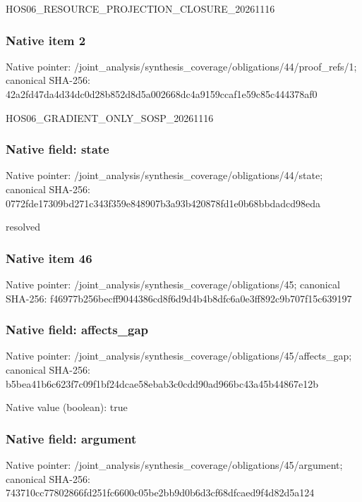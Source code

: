 \documentclass[10pt,a4paper]{article}
\begin{document}
\begingroup\raggedright\sloppy HOS06\_\allowbreak{}RESOURCE\_\allowbreak{}PROJECTION\_\allowbreak{}CLOSURE\_\allowbreak{}20261116\par\endgroup

\subsubsection{Native item 2}
Native pointer: /joint\_\allowbreak{}analysis/synthesis\_\allowbreak{}coverage/obligations/44/proof\_\allowbreak{}refs/1; canonical SHA-256: 42a2fd47da4d34dc0d28b852d8d5a002668dc4a9159ccaf1e59c85c444378af0

\begingroup\raggedright\sloppy HOS06\_\allowbreak{}GRADIENT\_\allowbreak{}ONLY\_\allowbreak{}SOSP\_\allowbreak{}20261116\par\endgroup

\subsubsection{Native field: state}
Native pointer: /joint\_\allowbreak{}analysis/synthesis\_\allowbreak{}coverage/obligations/44/state; canonical SHA-256: 0772fde17309bd271c343f359e848907b3a93b420878fd1e0b68bbdadcd98eda

\begingroup\raggedright\sloppy resolved\par\endgroup

\subsubsection{Native item 46}
Native pointer: /joint\_\allowbreak{}analysis/synthesis\_\allowbreak{}coverage/obligations/45; canonical SHA-256: f46977b256becff9044386cd8f6d9d4b4b8dfc6a0e3ff892c9b707f15c639197

\subsubsection{Native field: affects\_\allowbreak{}gap}
Native pointer: /joint\_\allowbreak{}analysis/synthesis\_\allowbreak{}coverage/obligations/45/affects\_\allowbreak{}gap; canonical SHA-256: b5bea41b6c623f7c09f1bf24dcae58ebab3c0cdd90ad966bc43a45b44867e12b

Native value (boolean): true

\subsubsection{Native field: argument}
Native pointer: /joint\_\allowbreak{}analysis/synthesis\_\allowbreak{}coverage/obligations/45/argument; canonical SHA-256: 743710cc77802866fd251fc6600c05be2bb9d0b6d3cf68dfcaed9f4d82d5a124
\end{document}
